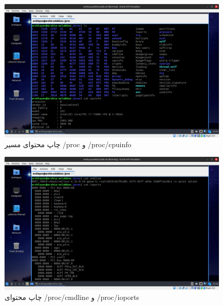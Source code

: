 \documentclass[12pt]{article}
\begin{document}
	\begin{figure}[H]
		\centering
		\includegraphics[width=\textwidth]{report3-resources/19.png}
		\caption{چاپ محتوای مسیر /proc و /proc/cpuinfo}
		\label{fig:18}
	\end{figure}
	\begin{figure}[H]
		\centering
		\includegraphics[width=\textwidth]{report3-resources/20.png}
		\caption{چاپ محتوای /proc/cmdline و /proc/ioports}
		\label{fig:19}
	\end{figure}
\end{document}
